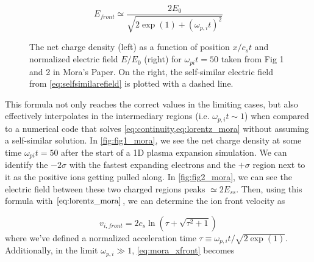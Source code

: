 \begin{equation}
	E_{front} \simeq \frac{2 E_0}{\sqrt{2 \exp(1) + (\omega_{p,i} t)^2}}
\end{equation}

\begin{figure}
	\centering 
	\caption{The net charge density (left) as a function of position $x / c_s t$ and normalized electric field $E/E_0$ (right) for $\omega_{pi} t = 50$ taken from Fig 1 and 2 in Mora's Paper\cite{Mora_2003_PRL}. On the right, the self-similar electric field from \cref{eq:selfsimilarefield} is plotted with a dashed line.}
\end{figure}
This formula not only reaches the correct values in the limiting cases, but also effectively interpolates in the intermediary regions (i.e. $\omega_{p,i} t \sim 1$) when compared to a numerical code that solves \cref{eq:continuity,eq:lorentz_mora} without assuming a self-similar solution. In \cref{fig:fig1_mora}, we see the net charge density at some time $\omega_{pi} t = 50$ after the start of a 1D plasma expansion simulation. We can identify the $-2\sigma$ with the fastest expanding electrons and the $+\sigma$ region next to it as the positive ions getting pulled along. In \cref{fig:fig2_mora}, we can see the electric field between these two charged regions peaks $\simeq 2 E_{ss}$. Then, using this formula with $\cref{eq:lorentz_mora}$, we can determine the ion front velocity as 

\begin{equation}
	v_{i,front} = 2 c_s \ln(\tau + \sqrt{\tau^2 + 1})	
\end{equation}
where we've defined a normalized acceleration time $\tau \equiv \omega_{p,i} t / \sqrt{2 \exp(1)}$. Additionally, in the limit $\omega_{p,i} \gg 1$, \cref{eq:mora_xfront} becomes

